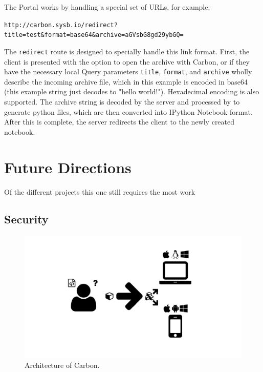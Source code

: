 The Portal works by handling a special set of URLs, for example: 

\texttt{http://carbon.sysb.io/redirect?title=test\&format=base64\&archive=aGVsbG8gd29ybGQ=}

The \texttt{redirect} route is designed to specially handle this link format.
First, the client is presented with the option to open the archive with Carbon, or if they have the necessary local
Query parameters \texttt{title}, \texttt{format}, and \texttt{archive} wholly describe the incoming archive file, which in this example is encoded in base64 (this example string just decodes to "hello world!").
Hexadecimal encoding is also supported.
The archive string is decoded by the server and processed by \autocite{sysbio2014sedml2py} to generate python files, which are then converted into IPython Notebook format.
After this is complete, the server redirects the client to the newly created notebook.

\section{Future Directions}

Of the different projects this one still requires the most work


\subsection{Security}

\begin{figure}
  \centering
  \includegraphics[width=\textwidth, page=28, trim=0cm 0cm 12cm 0cm, clip=true]{images/Figures.pdf}
  \caption{Architecture of Carbon.}
  \label{fig:carbon-architecture}
\end{figure}


